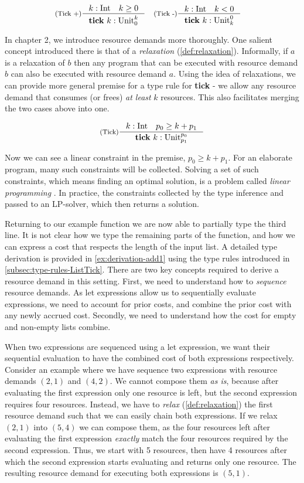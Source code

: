 \begin{align*}
	& \inference[(Tick +)]
	  {k : \typeint \quad k \geq 0}
	  {\tick{k} : \ratype{\unit}{k}{0}}
	&
	\inference[(Tick -)]
	{k : \typeint \quad k < 0}
	{\tick{k} : \ratype{\unit}{0}{k}}
	&
\end{align*}

In chapter 2, we introduce resource demands more thoroughly. One salient concept introduced there is that of a \emph{relaxation} (\cref{def:relaxation}). Informally, if \(a\) is a relaxation of \(b\) then any program that can be executed with resource demand \(b\) can also be executed with resource demand \(a\). Using the idea of relaxations, we can provide more general premise for a type rule for \textbf{tick} - we allow any resource demand that consumes (or frees) \emph{at least} \(k\) resources. This also facilitates merging the two cases above into one.

\[
   \inference[(Tick)]
   {k : \typeint \quad p_0 \geq k + p_1}
   {\tick{k} : \ratype{\unit}{p_0}{p_1}}
\]

Now we can see a linear constraint in the premise, \(p_0 \geq k + p_1\). For an elaborate program, many such constraints will be collected. Solving a set of such constraints, which means finding an optimal solution, is a problem called \emph{linear programming} \cite{LinearProgramming2023}. In practice, the constraints collected by the type inference and passed to an LP-solver, which then returns a solution. 

Returning to our example function we are now able to partially type the third line. It is not clear how we type the remaining parts of the function, and how we can express a cost that respects the length of the input list. A detailed type derivation is provided in \cref{ex:derivation-add1} using the type rules introduced in \cref{subsec:type-rules-ListTick}. There are two key concepts required to derive a resource demand in this setting. First, we need to understand how to \emph{sequence} resource demands. As let expressions allow us to sequentially evaluate expressions, we need to account for prior costs, and combine the prior cost with any newly accrued cost. Secondly, we need to understand how the cost for empty and non-empty lists combine.

When two expressions are sequenced using a let expression, we want their sequential evaluation to have the combined cost of both expressions respectively. Consider an example where we have sequence two expressions with resource demands \((2, 1)\) and \((4, 2)\). We cannot compose them \emph{as is}, because after evaluating the first expression only one resource is left, but the second expression requires four resources. Instead, we have to \emph{relax} (\cref{def:relaxation}) the first resource demand such that we can easily chain both expressions. If we relax \((2, 1)\) into \((5, 4)\) we can compose them, as the four resources left after evaluating the first expression \emph{exactly} match the four resources required by the second expression. Thus, we start with 5 resources, then have 4 resources after which the second expression starts evaluating and returns only one resource. The resulting resource demand for executing both expressions is \((5, 1)\). 

